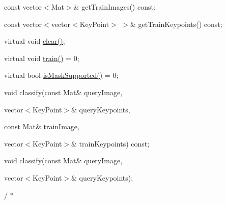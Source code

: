 {\ttfamily const vector$<$\+Mat$>$\& get\+Train\+Images() const;}

{\ttfamily }

{\ttfamily }

{\ttfamily const vector$<$vector$<$\+Key\+Point$>$ $>$\& get\+Train\+Keypoints() const;}

{\ttfamily }

{\ttfamily }

{\ttfamily virtual void \mbox{\hyperlink{classorg_1_1opencv_1_1features2d_1_1_generic_descriptor_matcher_aa5902c8aca6b21e07f0ea6709b632530}{clear()}};}

{\ttfamily }

{\ttfamily }

{\ttfamily virtual void \mbox{\hyperlink{classorg_1_1opencv_1_1features2d_1_1_generic_descriptor_matcher_a6e18cfac8850372f13893af1534a6570}{train()}} = 0;}

{\ttfamily }

{\ttfamily }

{\ttfamily virtual bool \mbox{\hyperlink{classorg_1_1opencv_1_1features2d_1_1_generic_descriptor_matcher_aaeb65b1ba87c1babb2d37fa7f2f4fa71}{is\+Mask\+Supported()}} = 0;}

{\ttfamily }

{\ttfamily }

{\ttfamily void classify(const Mat\& query\+Image,}

{\ttfamily }

{\ttfamily }

{\ttfamily vector$<$\+Key\+Point$>$\& query\+Keypoints,}

{\ttfamily }

{\ttfamily }

{\ttfamily const Mat\& train\+Image,}

{\ttfamily }

{\ttfamily }

{\ttfamily vector$<$\+Key\+Point$>$\& train\+Keypoints) const;}

{\ttfamily }

{\ttfamily }

{\ttfamily void classify(const Mat\& query\+Image,}

{\ttfamily }

{\ttfamily }

{\ttfamily vector$<$\+Key\+Point$>$\& query\+Keypoints);}

{\ttfamily }

{\ttfamily }

{\ttfamily / $\ast$}

